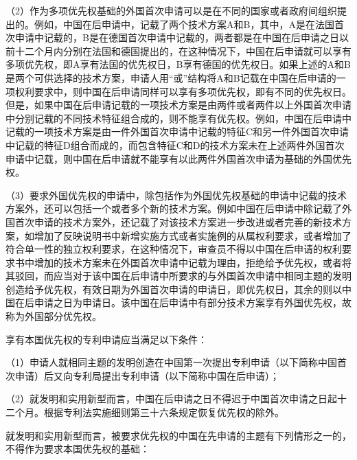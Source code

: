 {\setlength{\parindent}{17.1bp}（2）作为多项优先权基础的外国首次申请可以是在不同的国家或者政府间组织提出的。例如，中国在后申请中，记载了两个技术方案A和B，其中，A是在法国首次申请中记载的，B是在德国首次申请中记载的，两者都是在中国在后申请之日以前十二个月内分别在法国和德国提出的，在这种情况下，中国在后申请就可以享有多项优先权，即A享有法国的优先权日，B享有德国的优先权日。如果上述的A和B是两个可供选择的技术方案，申请人用“或”结构将A和B记载在中国在后申请的一项权利要求中，则中国在后申请同样可以享有多项优先权，即有不同的优先权日。但是，如果中国在后申请记载的一项技术方案是由两件或者两件以上外国首次申请中分别记载的不同技术特征组合成的，则不能享有优先权。例如，中国在后申请中记载的一项技术方案是由一件外国首次申请中记载的特征C和另一件外国首次申请中记载的特征D组合而成的，而包含特征C和D的技术方案未在上述两件外国首次申请中记载，则中国在后申请就不能享有以此两件外国首次申请为基础的外国优先权。\par}

{\setlength{\parindent}{17.1bp}（3）要求外国优先权的申请中，除包括作为外国优先权基础的申请中记载的技术方案外，还可以包括一个或者多个新的技术方案。例如中国在后申请中除记载了外国首次申请的技术方案外，还记载了对该技术方案进一步改进或者完善的新技术方案，如增加了反映说明书中新增实施方式或者实施例的从属权利要求，或者增加了符合单一性的独立权利要求，在这种情况下，审查员不得以中国在后申请的权利要求书中增加的技术方案未在外国首次申请中记载为理由，拒绝给予优先权，或者将其驳回，而应当对于该中国在后申请中所要求的与外国首次申请中相同主题的发明创造给予优先权，有效日期为外国首次申请的申请日，即优先权日，其余的则以中国在后申请之日为申请日。该中国在后申请中有部分技术方案享有外国优先权，故称为外国部分优先权。\par}

享有本国优先权的专利申请应当满足以下条件：

{\setlength{\parindent}{17.1bp}（1）申请人就相同主题的发明创造在中国第一次提出专利申请（以下简称中国首次申请）后又向专利局提出专利申请（以下简称中国在后申请）；\par}

{\setlength{\parindent}{17.1bp}（2）就发明和实用新型而言，中国在后申请之日不得迟于中国首次申请之日起十二个月。根据专利法实施细则第三十六条规定恢复优先权的除外。\par}

就发明和实用新型而言，被要求优先权的中国在先申请的主题有下列情形之一的，不得作为要求本国优先权的基础：


